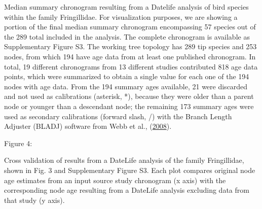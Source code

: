 Median summary chronogram resulting from a Datelife analysis of bird species within the family Fringillidae. For visualization purposes, we are showing a portion of the final median summary chronogram encompassing 57 species out of the 289 total included in the analysis. The complete chronogram is available as Supplementary Figure S3. The working tree topology has 289 tip species and 253 nodes, from which 194 have age data from at least one published chronogram. In total, 19 different chronograms from 13 different studies contributed 818 age data points, which were summarized to obtain a single value for each one of the 194 nodes with age data. From the 194 summary ages available, 21 were discarded and not used as calibrations (asterisk, *), because they were older than a parent node or younger than a descendant node; the remaining 173 summary ages were used as secondary calibrations (forward slash, /) with the Branch Length Adjuster (BLADJ) software from Webb et al., (\protect\hyperlink{ref-Webb2008}{2008}).



Figure 4:

Cross validation of results from a DateLife analysis of the family Fringillidae, shown in Fig. 3 and Supplementary Figure S3. Each plot compares original node age estimates from an input source study chronogram (x axis) with the corresponding node age resulting from a DateLife analysis excluding data from that study (y axis).
